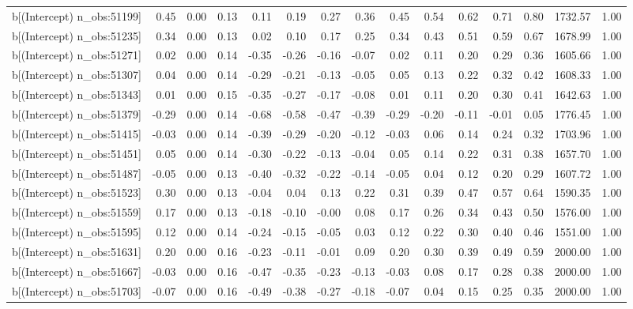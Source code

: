 \begin{table}[ht]
\begin{tabular}{rrrrrrrrrrrrrrr}
  b[(Intercept) n\_obs:51199] & 0.45 & 0.00 & 0.13 & 0.11 & 0.19 & 0.27 & 0.36 & 0.45 & 0.54 & 0.62 & 0.71 & 0.80 & 1732.57 & 1.00 \\ 
  b[(Intercept) n\_obs:51235] & 0.34 & 0.00 & 0.13 & 0.02 & 0.10 & 0.17 & 0.25 & 0.34 & 0.43 & 0.51 & 0.59 & 0.67 & 1678.99 & 1.00 \\ 
  b[(Intercept) n\_obs:51271] & 0.02 & 0.00 & 0.14 & -0.35 & -0.26 & -0.16 & -0.07 & 0.02 & 0.11 & 0.20 & 0.29 & 0.36 & 1605.66 & 1.00 \\ 
  b[(Intercept) n\_obs:51307] & 0.04 & 0.00 & 0.14 & -0.29 & -0.21 & -0.13 & -0.05 & 0.05 & 0.13 & 0.22 & 0.32 & 0.42 & 1608.33 & 1.00 \\ 
  b[(Intercept) n\_obs:51343] & 0.01 & 0.00 & 0.15 & -0.35 & -0.27 & -0.17 & -0.08 & 0.01 & 0.11 & 0.20 & 0.30 & 0.41 & 1642.63 & 1.00 \\ 
  b[(Intercept) n\_obs:51379] & -0.29 & 0.00 & 0.14 & -0.68 & -0.58 & -0.47 & -0.39 & -0.29 & -0.20 & -0.11 & -0.01 & 0.05 & 1776.45 & 1.00 \\ 
  b[(Intercept) n\_obs:51415] & -0.03 & 0.00 & 0.14 & -0.39 & -0.29 & -0.20 & -0.12 & -0.03 & 0.06 & 0.14 & 0.24 & 0.32 & 1703.96 & 1.00 \\ 
  b[(Intercept) n\_obs:51451] & 0.05 & 0.00 & 0.14 & -0.30 & -0.22 & -0.13 & -0.04 & 0.05 & 0.14 & 0.22 & 0.31 & 0.38 & 1657.70 & 1.00 \\ 
  b[(Intercept) n\_obs:51487] & -0.05 & 0.00 & 0.13 & -0.40 & -0.32 & -0.22 & -0.14 & -0.05 & 0.04 & 0.12 & 0.20 & 0.29 & 1607.72 & 1.00 \\ 
  b[(Intercept) n\_obs:51523] & 0.30 & 0.00 & 0.13 & -0.04 & 0.04 & 0.13 & 0.22 & 0.31 & 0.39 & 0.47 & 0.57 & 0.64 & 1590.35 & 1.00 \\ 
  b[(Intercept) n\_obs:51559] & 0.17 & 0.00 & 0.13 & -0.18 & -0.10 & -0.00 & 0.08 & 0.17 & 0.26 & 0.34 & 0.43 & 0.50 & 1576.00 & 1.00 \\ 
  b[(Intercept) n\_obs:51595] & 0.12 & 0.00 & 0.14 & -0.24 & -0.15 & -0.05 & 0.03 & 0.12 & 0.22 & 0.30 & 0.40 & 0.46 & 1551.00 & 1.00 \\ 
  b[(Intercept) n\_obs:51631] & 0.20 & 0.00 & 0.16 & -0.23 & -0.11 & -0.01 & 0.09 & 0.20 & 0.30 & 0.39 & 0.49 & 0.59 & 2000.00 & 1.00 \\ 
  b[(Intercept) n\_obs:51667] & -0.03 & 0.00 & 0.16 & -0.47 & -0.35 & -0.23 & -0.13 & -0.03 & 0.08 & 0.17 & 0.28 & 0.38 & 2000.00 & 1.00 \\ 
  b[(Intercept) n\_obs:51703] & -0.07 & 0.00 & 0.16 & -0.49 & -0.38 & -0.27 & -0.18 & -0.07 & 0.04 & 0.15 & 0.25 & 0.35 & 2000.00 & 1.00 \\ 

\end{tabular}
\end{table}
